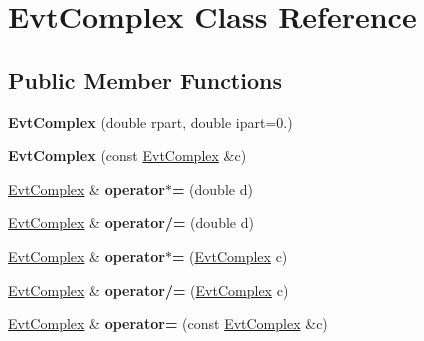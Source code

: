 \hypertarget{class_evt_complex}{}\section{Evt\+Complex Class Reference}
\label{class_evt_complex}
\subsection*{Public Member Functions}
\begin{DoxyCompactItemize}
\item 
\hypertarget{class_evt_complex_a9be7f65d58213b3e1d94450775ba0c79}{}{\bfseries Evt\+Complex} (double rpart, double ipart=0.)\label{class_evt_complex_a9be7f65d58213b3e1d94450775ba0c79}

\item 
\hypertarget{class_evt_complex_a59a46bf0863cc429192352fd8642c07a}{}{\bfseries Evt\+Complex} (const \hyperlink{class_evt_complex}{Evt\+Complex} \&c)\label{class_evt_complex_a59a46bf0863cc429192352fd8642c07a}

\item 
\hypertarget{class_evt_complex_a710d19c130d8f429d0e485ad993d5d72}{}\hyperlink{class_evt_complex}{Evt\+Complex} \& {\bfseries operator$\ast$=} (double d)\label{class_evt_complex_a710d19c130d8f429d0e485ad993d5d72}

\item 
\hypertarget{class_evt_complex_ae755721ceeb00bb5589827101dd2e9ae}{}\hyperlink{class_evt_complex}{Evt\+Complex} \& {\bfseries operator/=} (double d)\label{class_evt_complex_ae755721ceeb00bb5589827101dd2e9ae}

\item 
\hypertarget{class_evt_complex_a0c6a7708dd4b234bfcc18fa3111f7737}{}\hyperlink{class_evt_complex}{Evt\+Complex} \& {\bfseries operator$\ast$=} (\hyperlink{class_evt_complex}{Evt\+Complex} c)\label{class_evt_complex_a0c6a7708dd4b234bfcc18fa3111f7737}

\item 
\hypertarget{class_evt_complex_a2cd6686aaec64d69784c1202dc209a40}{}\hyperlink{class_evt_complex}{Evt\+Complex} \& {\bfseries operator/=} (\hyperlink{class_evt_complex}{Evt\+Complex} c)\label{class_evt_complex_a2cd6686aaec64d69784c1202dc209a40}

\item 
\hypertarget{class_evt_complex_a3018f974ffebd63e9b0700a958f9874e}{}\hyperlink{class_evt_complex}{Evt\+Complex} \& {\bfseries operator=} (const \hyperlink{class_evt_complex}{Evt\+Complex} \&c)\label{class_evt_complex_a3018f974ffebd63e9b0700a958f9874e}


\end{DoxyCompactItemize}
